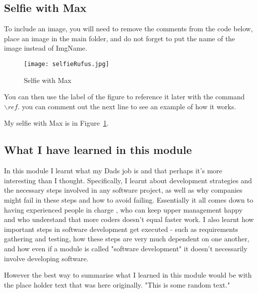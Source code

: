\subsection{Selfie with Max}

To include an image, you will need to remove the comments from the code below, place an image in the main folder, and do not forget to put the name of the image instead of ImgName. 

\begin{figure}[h]
\caption{Selfie with Max}
\centering
\texttt{[image: selfieRufus.jpg]}
\label{fig:selfie}
\end{figure}

You can then use the label of the figure to reference it later with the command ${\backslash}ref$. you can comment out the next line to see an example of how it works.

My selfie with Max is in  Figure~\ref{fig:selfie}.

\subsection{What I have learned in this module}
In this module I learnt what my Dads job is and that perhaps it's more interesting than I thought. Specifically, I learnt about development strategies and the necessary steps involved in any software project, as well as why companies might fail in these steps and how to avoid failing. Essentially it all comes down to having experienced people in charge , who can keep upper management happy and who understand that more coders doesn't equal faster work. I also learnt how important steps in software development get executed - such as requirements gathering and testing, how these steps are very much dependent on one another, and how even if a module is called "software development" it doesn't necessarily involve developing software.

However the best way to summarise what I learned in this module would be with the place holder text that was here originally.
"This is some random text."


